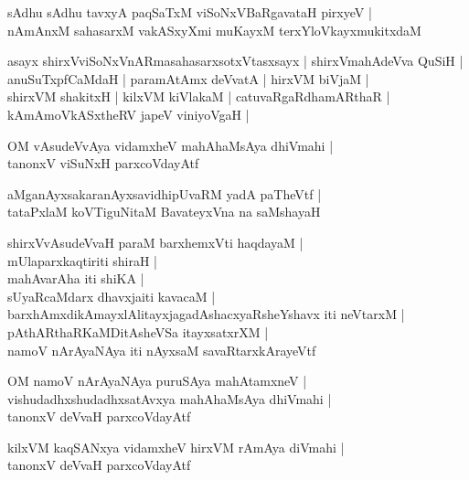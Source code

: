 \documentclass[twoside,12pt,openright]{book}
\newcounter{shloka}[chapter]
\begin{document}
\begin{shloka}%
sAdhu sAdhu tavxyA paqSaTxM viSoNxVBaRgavataH pirxyeV |\\
nAmAnxM sahasarxM vakASxyXmi muKayxM terxYloVkayxmukitxdaM 
\end{shloka}

\begin{shloka}%
asayx shirxVviSoNxVnARmasahasarxsotxVtasxsayx | shirxVmahAdeVva QuSiH |\\
anuSuTxpfCaMdaH | paramAtAmx deVvatA | hirxVM biVjaM |\\
shirxVM shakitxH | kilxVM kiVlakaM | catuvaRgaRdhamARthaR |\\
kAmAmoVkASxtheRV japeV viniyoVgaH |
\end{shloka}

\begin{shloka}%
OM vAsudeVvAya vidamxheV mahAhaMsAya dhiVmahi |\\
tanonxV viSuNxH parxcoVdayAtf
\end{shloka}

\begin{shloka}%
aMganAyxsakaranAyxsavidhipUvaRM yadA paTheVtf |\\
tataPxlaM koVTiguNitaM BavateyxVna na saMshayaH
\end{shloka}

\begin{shloka}%
shirxVvAsudeVvaH paraM barxhemxVti haqdayaM |\\
mUlaparxkaqtiriti shiraH |\\
mahAvarAha iti shiKA |\\
sUyaRcaMdarx dhavxjaiti kavacaM |\\
barxhAmxdikAmayxlAlitayxjagadAshacxyaRsheYshavx iti neVtarxM |\\
pAthARthaRKaMDitAsheVSa itayxsatxrXM |\\
namoV nArAyaNAya iti nAyxsaM savaRtarxkArayeVtf 
\end{shloka}

\begin{shloka}%
OM namoV nArAyaNAya puruSAya mahAtamxneV |\\
vishudadhxshudadhxsatAvxya mahAhaMsAya dhiVmahi |\\
tanonxV deVvaH parxcoVdayAtf
\end{shloka}

\begin{shloka}%
kilxVM kaqSANxya vidamxheV hirxVM rAmAya diVmahi |\\
tanonxV deVvaH parxcoVdayAtf
\end{shloka}
\end{document}
